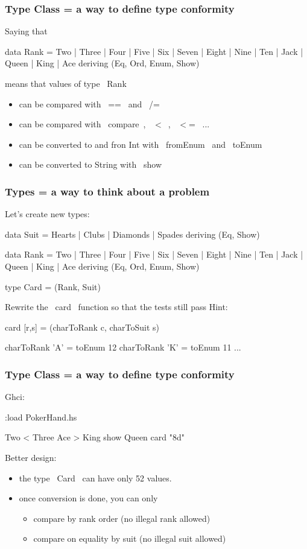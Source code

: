 \documentclass[11pt,xcolor={dvipsnames}]{beamer}
\newcommand{\tc}{\textcolor}
\newcommand{\key}[1]{\tc{orange}{#1}}
\newcommand{\rk}{\enskip{\key{$\hookleftarrow$}}}
\newcommand{\vs}{\vspace{1em}}
\begin{document}
\begin{frame}[fragile]
\frametitle{Type Class = a way to define type conformity}
Saying that
\begin{haskell}
data Rank = Two | Three | Four | Five | Six | Seven | Eight 
          | Nine | Ten | Jack | Queen | King | Ace
    deriving (Eq, Ord, Enum, Show)
\end{haskell}
means that values of type ~Rank~ 
\begin{itemize}
\item  can be compared with ~==~ and ~/=~ 
\item  can be compared with ~compare~, ~$<$~, ~$<$=~ ...
\item  can be converted to and fron Int with ~fromEnum~ and ~toEnum~
\item  can be converted to String with ~show~
\end{itemize}
\end{frame}
\begin{frame}[fragile]
\frametitle{Types = a way to think about a problem}
Let's create new types:
\begin{haskell}
data Suit = Hearts | Clubs | Diamonds | Spades
    deriving (Eq, Show)

data Rank = Two | Three | Four | Five | Six | Seven | Eight 
          | Nine | Ten | Jack | Queen | King | Ace
    deriving (Eq, Ord, Enum, Show)

type Card = (Rank, Suit)
\end{haskell}
Rewrite the ~card~ function so that the tests still pass
\vs
Hint:
\begin{haskell}
card [r,s] = (charToRank c, charToSuit s)

charToRank 'A' = toEnum 12
charToRank 'K' = toEnum 11
...
\end{haskell}
\end{frame}
\begin{frame}[fragile]
\frametitle{Type Class = a way to define type conformity}
Ghci:
\begin{term}
:load PokerHand.hs\rk

Two < Three\rk
Ace > King\rk
show Queen\rk
card "8d"\rk
\end{term}
Better design:
\begin{itemize}
\item  the type ~Card~ can have only 52 values.
\item  once conversion is done, you can only
\begin{itemize}
\item compare by rank order (no illegal rank allowed)
\item compare on equality by suit (no illegal suit allowed)
\end{itemize}
\end{itemize}
\end{frame}
\end{document}
